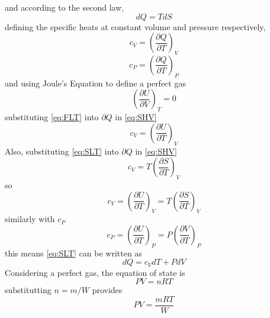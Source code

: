 %
%
and according to the second law,
\begin{equation}\label{eq:SLT}
dQ=TdS
\end{equation}%
%
defining the specific heats at constant volume and pressure respectively,
\begin{equation}\label{eq:SHV}
c_V=\left(\frac{\partial Q}{\partial T}\right)_V
\end{equation}
\begin{equation}\label{eq:SHP}
c_P=\left(\frac{\partial Q}{\partial T}\right)_P
\end{equation}
and using Joule's Equation to define a perfect gas
\begin{equation}\label{eq:Joule}
\left(\frac{\partial U}{\partial V}\right)_T=0
\end{equation}
substituting \ref{eq:FLT} into $\partial Q$ in \ref{eq:SHV}
\begin{equation}
c_V=\left(\frac{\partial U}{\partial T}\right)_V
\end{equation}
Also, substituting \ref{eq:SLT} into $\partial Q$ in \ref{eq:SHV}
\begin{equation}
c_V=T\left(\frac{\partial S}{\partial T}\right)_V
\end{equation}
so
\begin{equation}\label{eq:cV}
c_V=\left(\frac{\partial U}{\partial T}\right)_V=T\left(\frac{\partial S}{\partial T}\right)_V
\end{equation}
similarly with $c_P$
\begin{equation}\label{cP}
c_P=\left(\frac{\partial U}{\partial T}\right)_P=P\left(\frac{\partial V}{\partial T}\right)_P
\end{equation}
this means \ref{eq:SLT} can be written as
\begin{equation}\label{eq:NewSLT}
dQ=c_VdT+PdV
\end{equation}
Considering a perfect gas, the equation of state is
\begin{equation}\label{eq:IGL}
PV=nRT
\end{equation}%
%
substitutting $n=m/W$ provides%
\begin{equation}
PV=\frac{mRT}{W}
\end{equation}
